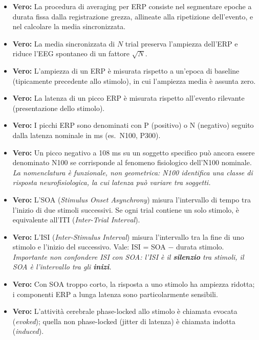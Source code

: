 \begin{itemize}
    \item \textbf{Vero:} La procedura di averaging per ERP consiste nel segmentare epoche a durata fissa dalla registrazione grezza, allineate alla ripetizione dell'evento, e nel calcolare la media sincronizzata.
    
    \item \textbf{Vero:} La media sincronizzata di $N$ trial preserva l'ampiezza dell'ERP e riduce l'EEG spontaneo di un fattore $\sqrt{N}$.
    
    \item \textbf{Vero:} L'ampiezza di un ERP è misurata rispetto a un'epoca di baseline (tipicamente precedente allo stimolo), in cui l'ampiezza media è assunta zero.
    
    \item \textbf{Vero:} La latenza di un picco ERP è misurata rispetto all'evento rilevante (presentazione dello stimolo).
    
    \item \textbf{Vero:} I picchi ERP sono denominati con P (positivo) o N (negativo) seguito dalla latenza nominale in ms (es.\ N100, P300).
    
    \item \textbf{Vero:} Un picco negativo a 108 ms su un soggetto specifico può ancora essere denominato N100 se corrisponde al fenomeno fisiologico dell'N100 nominale.
    \textit{La nomenclatura è funzionale, non geometrica: N100 identifica una classe di risposta neurofisiologica, la cui latenza può variare tra soggetti.}
    
    \item \textbf{Vero:} L'SOA (\textit{Stimulus Onset Asynchrony}) misura l'intervallo di tempo tra l'inizio di due stimoli successivi. Se ogni trial contiene un solo stimolo, è equivalente all'ITI (\textit{Inter-Trial Interval}).
    
    \item \textbf{Vero:} L'ISI (\textit{Inter-Stimulus Interval}) misura l'intervallo tra la fine di uno stimolo e l'inizio del successivo. Vale: ISI = SOA $-$ durata stimolo.
    \textit{Importante non confondere ISI con SOA: l'ISI è il \textbf{silenzio} tra stimoli, il SOA è l'intervallo tra gli \textbf{inizi}.}
    
    \item \textbf{Vero:} Con SOA troppo corto, la risposta a uno stimolo ha ampiezza ridotta; i componenti ERP a lunga latenza sono particolarmente sensibili.
    
    \item \textbf{Vero:} L'attività cerebrale phase-locked allo stimolo è chiamata evocata (\textit{evoked}); quella non phase-locked (jitter di latenza) è chiamata indotta (\textit{induced}).
    

\end{itemize}
